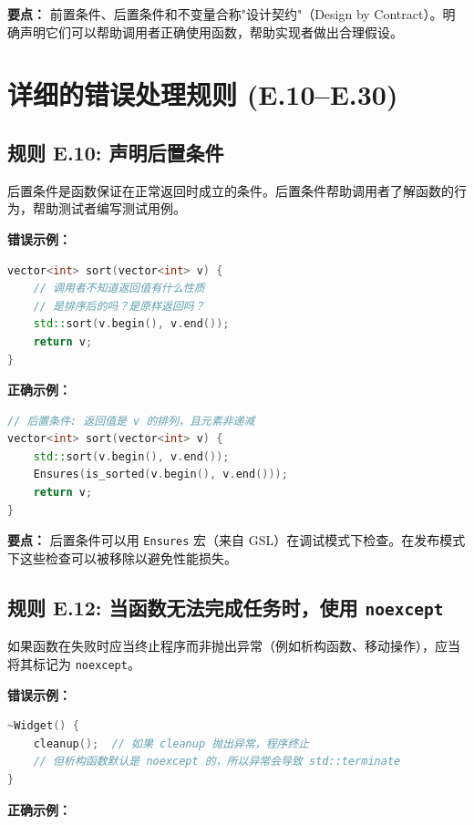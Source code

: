 \textbf{要点：} 前置条件、后置条件和不变量合称"设计契约"（Design by Contract）。明确声明它们可以帮助调用者正确使用函数，帮助实现者做出合理假设。

\section{详细的错误处理规则 (E.10--E.30)}

\subsection*{\textbf{规则 E.10:} 声明后置条件}

后置条件是函数保证在正常返回时成立的条件。后置条件帮助调用者了解函数的行为，帮助测试者编写测试用例。

\textbf{错误示例：}

\begin{lstlisting}[language=C++]
vector<int> sort(vector<int> v) {
    // 调用者不知道返回值有什么性质
    // 是排序后的吗？是原样返回吗？
    std::sort(v.begin(), v.end());
    return v;
}
\end{lstlisting}

\textbf{正确示例：}

\begin{lstlisting}[language=C++]
// 后置条件: 返回值是 v 的排列，且元素非递减
vector<int> sort(vector<int> v) {
    std::sort(v.begin(), v.end());
    Ensures(is_sorted(v.begin(), v.end()));
    return v;
}
\end{lstlisting}

\textbf{要点：} 后置条件可以用 \texttt{Ensures} 宏（来自 GSL）在调试模式下检查。在发布模式下这些检查可以被移除以避免性能损失。

\subsection*{\textbf{规则 E.12:} 当函数无法完成任务时，使用 \texttt{noexcept}}

如果函数在失败时应当终止程序而非抛出异常（例如析构函数、移动操作），应当将其标记为 \texttt{noexcept}。

\textbf{错误示例：}

\begin{lstlisting}[language=C++]
~Widget() {
    cleanup();  // 如果 cleanup 抛出异常，程序终止
    // 但析构函数默认是 noexcept 的，所以异常会导致 std::terminate
}
\end{lstlisting}

\textbf{正确示例：}

